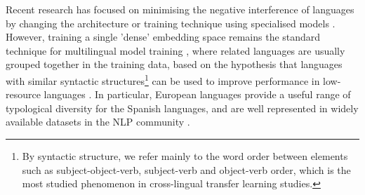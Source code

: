 

Recent research has focused on minimising the negative interference of languages by changing the architecture or training technique using specialised models \cite{zhou_moe-lpr_2024, blevins_breaking_2024}. However, training a single 'dense' embedding space remains the standard technique for multilingual model training \cite{avramidis_occiglot_2024, martins_eurollm_2024, ali_teuken-7b-base_2024}, where related languages are usually grouped together in the training data, based on the hypothesis that languages with similar syntactic structures\footnote{By syntactic structure, we refer mainly to the word order between elements such as subject-object-verb, subject-verb and object-verb order, which is the most studied phenomenon in cross-lingual transfer learning studies.} can be used to improve performance in low-resource languages \cite{chai_crosslingual_2022, philippy_towards_2023}. In particular, European languages provide a useful range of typological diversity for the Spanish languages, and are well represented in widely available datasets in the NLP community \cite{zhou_moe-lpr_2024, joshi_state_2021, blevins_breaking_2024}.

